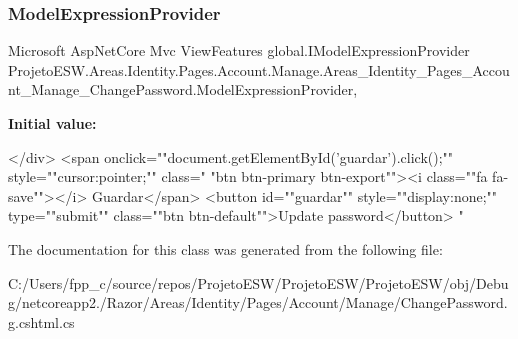 \subsubsection{\texorpdfstring{Model\+Expression\+Provider}{ModelExpressionProvider}}
{\footnotesize\ttfamily Microsoft Asp\+Net\+Core Mvc View\+Features global.\+I\+Model\+Expression\+Provider Projeto\+E\+S\+W.\+Areas.\+Identity.\+Pages.\+Account.\+Manage.\+Areas\+\_\+\+Identity\+\_\+\+Pages\+\_\+\+Account\+\_\+\+Manage\+\_\+\+Change\+Password.\+Model\+Expression\+Provider\hspace{0.3cm}{\ttfamily [get]}, {}}

{\bfseries Initial value\+:}
\begin{DoxyCode}

            </div>
            <span onclick=\textcolor{stringliteral}{""}document.getElementById(\textcolor{stringliteral}{'guardar'}).click();\textcolor{stringliteral}{""} style=\textcolor{stringliteral}{""}cursor:pointer;\textcolor{stringliteral}{""} \textcolor{keyword}{class}=\textcolor{stringliteral}{"
      "}btn btn-primary btn-export\textcolor{stringliteral}{""}><i \textcolor{keyword}{class}=\textcolor{stringliteral}{""}fa fa-save\textcolor{stringliteral}{""}></i> Guardar</span>
            <button \textcolor{keywordtype}{id}=\textcolor{stringliteral}{""}guardar\textcolor{stringliteral}{""} style=\textcolor{stringliteral}{""}display:none;\textcolor{stringliteral}{""} type=\textcolor{stringliteral}{""}submit\textcolor{stringliteral}{""} \textcolor{keyword}{class}=\textcolor{stringliteral}{""}btn btn-\textcolor{keywordflow}{default}\textcolor{stringliteral}{""}>Update
       password</button>
        \textcolor{stringliteral}{"}
\end{DoxyCode}


The documentation for this class was generated from the following file\+:\begin{DoxyCompactItemize}
\item 
C\+:/\+Users/fpp\+\_\+c/source/repos/\+Projeto\+E\+S\+W/\+Projeto\+E\+S\+W/\+Projeto\+E\+S\+W/obj/\+Debug/netcoreapp2./\+Razor/\+Areas/\+Identity/\+Pages/\+Account/\+Manage/Change\+Password.\+g.\+cshtml.\+cs\end{DoxyCompactItemize}

